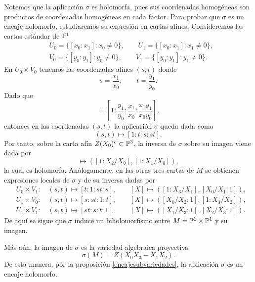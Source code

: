 \begin{example}
		Notemos que la aplicación $\sigma$ es holomorfa, pues sus coordenadas homogéneas son productos de coordenadas homogéneas en cada factor. Para probar que $\sigma$ es un encaje holomorfo, estudiaremos su expresión en cartas afines. Consideremos las cartas estándar de $\mathbb{P}^1$
		\begin{align*}
			&U_0=\{[x_0:x_1]:x_0\neq 0\},\qquad U_1=\{[x_0:x_1]:x_1\neq 0\},\\
			&V_0=\{[y_0:y_1]:y_0\neq 0\},\qquad V_1=\{[y_0:y_1]:y_1\neq 0\}.
		\end{align*}
		En $U_0\times V_0$ tenemos las coordenadas afines $(s,t)$ donde
		\begin{equation*}
			s=\frac{x_1}{x_0},\qquad t=\frac{y_1}{y_0}.
		\end{equation*}
		Dado que 
		\begin{equation*}
			[x_0y_0:x_0y_1:x_1y_0:x_1y_1]=\left[ 1:\frac{y_1}{y_0}:\frac{x_1}{x_0}:\frac{x_1y_1}{x_0y_0}\right],
		\end{equation*}
		entonces en las coordenadas $(s,t)$ la aplicación $\sigma$ queda dada como
		\begin{equation*}
			(s,t)\longmapsto [1:t:s:st].
		\end{equation*}
		Por tanto, sobre la carta afín $Z(X_0)^c\subset\mathbb{P}^3$, la inversa de $\sigma$ sobre su imagen viene dada por
		\begin{equation*}
			[X_0:X_1:X_2:X_3]\longmapsto \left([1:X_2/X_0],[1:X_1/X_0]\right),
		\end{equation*}
		la cual es holomorfa. Análogamente, en las otras tres cartas de $M$ se obtienen expresiones locales de $\sigma$ y de su inversa dadas por
		\begin{align*}
			&U_0\times V_1:\quad (s,t)\mapsto [t:1:st:s],\qquad
			[X]\mapsto \left([1:X_3/X_1],[X_0/X_1:1]\right),\\
			&U_1\times V_0:\quad (s,t)\mapsto [s:st:1:t],\qquad
			[X]\mapsto \left([X_0/X_2:1],[1:X_3/X_2]\right),\\
			&U_1\times V_1:\quad (s,t)\mapsto [st:s:t:1],\qquad
			[X]\mapsto \left([X_1/X_3:1],[X_2/X_3:1]\right).
		\end{align*}
		De aquí se sigue que $\sigma$ induce un biholomorfismo entre $M=\mathbb{P}^1\times\mathbb{P}^1$ y su imagen.
		
		Más aún, la imagen de $\sigma$ es la variedad algebraica proyectiva
		\begin{equation*}
			\sigma(M)=Z(X_0X_3-X_1X_2).
		\end{equation*}
		De esta manera, por la proposición \ref{encajesubvariedades}, la aplicación $\sigma$ es un encaje holomorfo.
		

\end{example}
